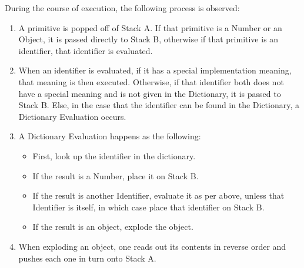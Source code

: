 		During the course of execution, the following process is observed:
		\begin{enumerate}
			\item A primitive is popped off of Stack A. If that primitive is a Number or an Object, it is passed directly to Stack B, otherwise if that primitive is an identifier, that identifier is evaluated.
			\item When an identifier is evaluated, if it has a special implementation meaning, that meaning is then executed. Otherwise, if that identifier both does not have a special meaning and is not given in the Dictionary, it is passed to Stack B. Else, in the case that the identifier can be found in the Dictionary, a Dictionary Evaluation occurs.
			\item A Dictionary Evaluation happens as the following:
			\begin{itemize}
				\item First, look up the identifier in the dictionary.
				\item If the result is a Number, place it on Stack B.
				\item If the result is another Identifier, evaluate it as per above, unless that Identifier is itself, in which case place that identifier on Stack B.
				\item If the result is an object, explode the object.
			\end{itemize}
			\item When exploding an object, one reads out its contents in reverse order and pushes each one in turn onto Stack A.
		\end{enumerate}
